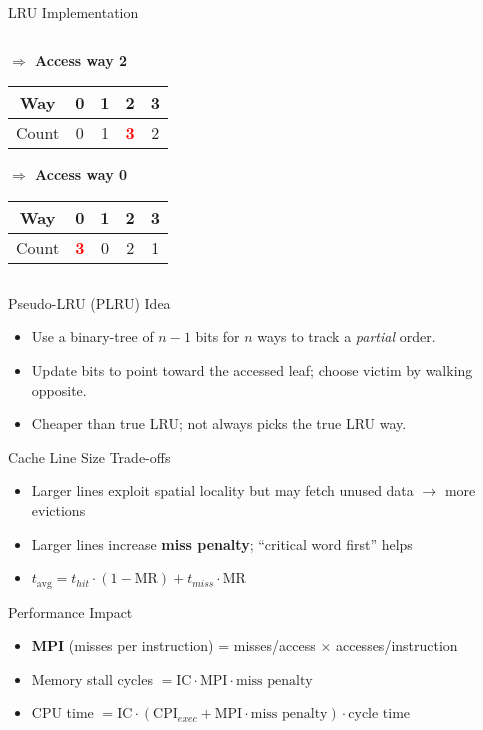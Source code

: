 \documentclass[aspectratio=169,12pt]{beamer}
\begin{document}
\begin{frame}[fragile]{LRU Implementation}
\begin{columns}[T]
\begin{column}{0.30\textwidth}
\vspace{0.4cm}
\textbf{$\Rightarrow$ Access way 2}\\
\vspace{0.1cm}
\begin{tabular}{|c|c|c|c|c|}
\hline
Way & 0 & 1 & 2 & 3 \\
\hline
Count & 0 & 1 & \textcolor{red}{\textbf{3}} & 2 \\
\hline
\end{tabular}

\vspace{0.4cm}
\textbf{$\Rightarrow$ Access way 0}\\
\vspace{0.1cm}
\begin{tabular}{|c|c|c|c|c|}
\hline
Way & 0 & 1 & 2 & 3 \\
\hline
Count & \textcolor{red}{\textbf{3}} & 0 & 2 & 1 \\
\hline
\end{tabular}
\end{column}
\end{columns}
\end{frame}

\begin{frame}{Pseudo-LRU (PLRU) Idea}
\begin{itemize}
  \item Use a binary-tree of $n-1$ bits for $n$ ways to track a \emph{partial} order.
  \item Update bits to point toward the accessed leaf; choose victim by walking opposite.
  \item Cheaper than true LRU; not always picks the true LRU way.
\end{itemize}
\end{frame}

\begin{frame}{Cache Line Size Trade-offs}
\begin{itemize}
  \item Larger lines exploit spatial locality but may fetch unused data $\rightarrow$ more evictions
  \item Larger lines increase \textbf{miss penalty}; ``critical word first'' helps
  \item $t_{\text{avg}} = t_{hit}\cdot(1-\text{MR}) + t_{miss}\cdot \text{MR}$
\end{itemize}
\end{frame}

\begin{frame}{Performance Impact}
\begin{itemize}
  \item \textbf{MPI} (misses per instruction) = misses/access $\times$ accesses/instruction
  \item Memory stall cycles $= \text{IC}\cdot \text{MPI}\cdot \text{miss penalty}$
  \item CPU time $= \text{IC}\cdot(\text{CPI}_{exec}+\text{MPI}\cdot \text{miss penalty})\cdot \text{cycle time}$
\end{itemize}
\end{frame}
\end{document}
